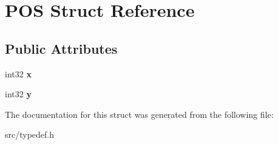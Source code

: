 \hypertarget{struct_p_o_s}{}\section{P\+O\+S Struct Reference}
\label{struct_p_o_s}
\subsection*{Public Attributes}
\begin{DoxyCompactItemize}
\item 
\hypertarget{struct_p_o_s_a5316a709ea1f5a9fbf5b35562cfc8838}{}int32 {\bfseries x}\label{struct_p_o_s_a5316a709ea1f5a9fbf5b35562cfc8838}

\item 
\hypertarget{struct_p_o_s_a30e6c9bb38d9f7403f4023e7e3da4808}{}int32 {\bfseries y}\label{struct_p_o_s_a30e6c9bb38d9f7403f4023e7e3da4808}

\end{DoxyCompactItemize}


The documentation for this struct was generated from the following file\+:\begin{DoxyCompactItemize}
\item 
src/typedef.\+h\end{DoxyCompactItemize}

